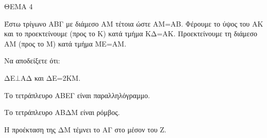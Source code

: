 
ΘΕΜΑ 4

Έστω τρίγωνο ΑΒΓ με διάμεσο ΑΜ τέτοια ώστε ΑΜ=ΑΒ. Φέρουμε το ύψος του ΑΚ και το προεκτείνουμε (προς το Κ) κατά τμήμα ΚΔ=ΑΚ. Προεκτείνουμε τη διάμεσο ΑΜ (προς το Μ) κατά τμήμα ΜΕ=ΑΜ.

Να αποδείξετε ότι:

\begin{alist}
\item ΔΕ$\bot$ΑΔ και ΔΕ=2ΚΜ. 

\item Το τετράπλευρο ΑΒΕΓ είναι παραλληλόγραμμο. 

\item Το τετράπλευρο ΑΒΔΜ είναι ρόμβος. 

\item Η προέκταση της ΔΜ τέμνει το ΑΓ στο μέσον του Ζ. 


\end{alist}
